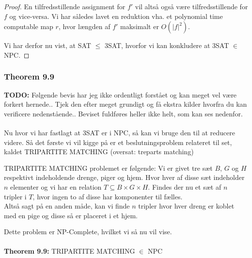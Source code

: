 \begin{proof}
En tilfredsstillende assignment for $f'$ vil altså også være tilfredsstillende for $f$ og vice-versa. Vi har således lavet en reduktion vha. et polynomial time computable map $r$, hvor længden af $f'$ maksimalt er $O(|f|^2)$.

Vi har derfor nu vist, at SAT $\leq$ 3SAT, hvorfor vi kan konkludere at 3SAT $\in$ NPC.
\end{proof}

\subsubsection{Theorem 9.9}

\textbf{TODO: } Følgende bevis har jeg ikke ordentligt forstået og kan meget vel være forkert hernede.. Tjek den efter meget grundigt og få ekstra kilder hvorfra du kan verificere nedenstående.. Beviset fuldføres heller ikke helt, som kan ses nedenfor. \\
~\\
Nu hvor vi har fastlagt at 3SAT er i NPC, så kan vi bruge den til at reducere videre. Så det første vi vil kigge på er et beslutningsproblem relateret til set, kaldet TRIPARTITE MATCHING (oversat: treparts matching)

TRIPARTITE MATCHING problemet er følgende: Vi er givet tre sæt $B$, $G$ og $H$ respektivt indeholdende drenge, piger og hjem. Hvor hver af disse sæt indeholder $n$ elementer og vi har en relation $T \subseteq B \times G \times H$. Findes der nu et sæt af $n$ tripler i $T$, hvor ingen to af disse har komponenter til fælles. \\

Altså sagt på en anden måde, kan vi finde $n$ tripler hvor hver dreng er koblet med en pige og disse så er placeret i et hjem.

Dette problem er NP-Complete, hvilket vi så nu vil vise.
\\
~\\
\textbf{Theorem 9.9:} TRIPARTITE MATCHING $\in$ NPC

